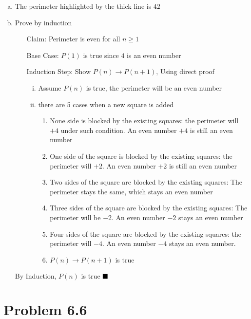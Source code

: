 \documentclass{article}
\def\math#1{$#1$}
\begin{document}
\begin{enumerate}[(a)]
    \item The perimeter highlighted by the thick line is \math{42}
    \item Prove by induction
        \begin{itemize}
            \item [Claim: ] Perimeter is even for all \math{n \geq 1}
            \item [Base Case: ] \math{P(1)} is true since \math{4} is an even number
            \item [Induction Step: ] Show \math{P(n) \to P(n+1)}, Using direct proof 
                \begin{enumerate}[i)]
                    \item Assume \math{P(n)} is true, the perimeter will be an even number
                    \item there are 5 cases when a new square is added
                    \begin{enumerate}[(1)]
                        \item None side is blocked by the existing squares: the perimeter will \math{+4} under such condition. An even number \math{+4} is still an even number
                        \item One side of the square is blocked by the existing squares: the perimeter will \math{+2}. An even number \math{+2} is still an even number
                        \item Two sides of the square are blocked by the existing squares: The perimeter stays the same, which stays an even number
                        \item Three sides of the square are blocked by the existing squares: The perimeter will be \math{-2}. An even number \math{-2} stays an even number
                        \item Four sides of the square are blocked by the existing squares: the perimeter will \math{-4}. An even number \math{-4} stays an even number.
                        \item \math{P(n) \to P(n+1)} is true
                    \end{enumerate}
                \end{enumerate}
        \end{itemize}
        By Induction, \math{P(n)} is true  \math{\hfill{\blacksquare}}
\end{enumerate}

\section{Problem 6.6}
\end{document}
